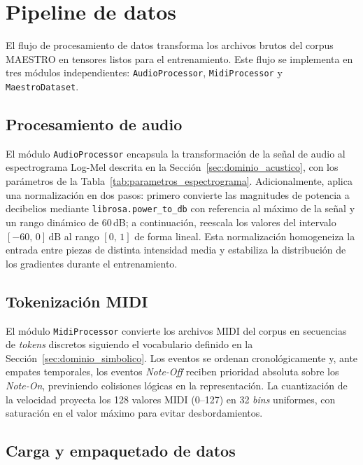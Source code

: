 \section{Pipeline de datos}
\label{sec:pipeline_datos}

El flujo de procesamiento de datos transforma los archivos brutos del
corpus MAESTRO en tensores listos para el entrenamiento. Este flujo se
implementa en tres módulos independientes: \texttt{AudioProcessor},
\texttt{MidiProcessor} y \texttt{MaestroDataset}.

\subsection{Procesamiento de audio}

El módulo \texttt{AudioProcessor} encapsula la transformación de la
señal de audio al espectrograma Log-Mel descrita en la
Sección~\ref{sec:dominio_acustico}, con los parámetros de la
Tabla~\ref{tab:parametros_espectrograma}. Adicionalmente, aplica una
normalización en dos pasos: primero convierte las magnitudes de potencia
a decibelios mediante \texttt{librosa.power\_to\_db} con referencia al
máximo de la señal y un rango dinámico de 60\,dB; a continuación,
reescala los valores del intervalo $[-60,\,0]\,\mathrm{dB}$ al rango
$[0,\,1]$ de forma lineal. Esta normalización homogeneiza la entrada
entre piezas de distinta intensidad media y estabiliza la distribución
de los gradientes durante el entrenamiento.

\subsection{Tokenización MIDI}

El módulo \texttt{MidiProcessor} convierte los archivos MIDI del corpus
en secuencias de \textit{tokens} discretos siguiendo el vocabulario
definido en la Sección~\ref{sec:dominio_simbolico}. Los eventos se
ordenan cronológicamente y, ante empates temporales, los eventos
\textit{Note-Off} reciben prioridad absoluta sobre los \textit{Note-On},
previniendo colisiones lógicas en la representación. La cuantización de
la velocidad proyecta los 128 valores MIDI (0--127) en 32 \textit{bins}
uniformes, con saturación en el valor máximo para evitar desbordamientos.

\subsection{Carga y empaquetado de datos}

